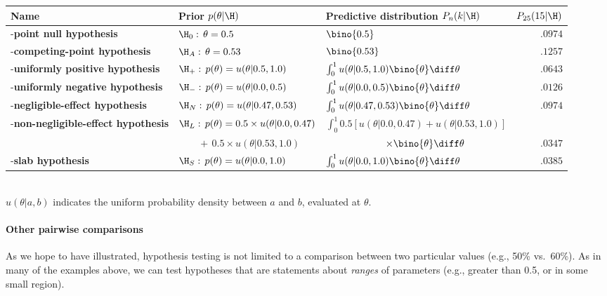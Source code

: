 \begin{tcolorbox}[title=Box~2: Model definitions and equations,code={\singlespacing}]
\tiny\centering\begin{tabular}{lllr}\hline
Name & Prior $p(\theta|\H)$  & Predictive distribution $P_n(k|\H)$&$P_{25}(15|\H)$\\[1ex]\hline
\hyp{\textbf{point null hypothesis}} 
		& $\H_0:\,\theta = 0.5$                        
		& $\bino{0.5}$ 
		& $.0974$
		\\[1ex]
\hyp{\textbf{competing-point hypothesis}}
		& $\H_A:\,\theta = 0.53$
		& $\bino{0.53}$ 
		& $.1257$
		\\[1ex]
\hyp{\textbf{uniformly positive hypothesis}}
		& $\H_+:\,p(\theta) = u(\theta|0.5, 1.0)$            
		& $\int_0^1 u(\theta|0.5, 1.0) \bino{\theta} \diff\theta$ 
		& $.0643$
		\\[1ex]
\hyp{\textbf{uniformly negative hypothesis}}
		& $\H_-:\,p(\theta) = u(\theta|0.0, 0.5)$
		& $\int_0^1 u(\theta|0.0, 0.5) \bino{\theta} \diff\theta$
		& $.0126$
		\\[1ex]
\hyp{\textbf{negligible-effect hypothesis}} 
		& $\H_N:\,p(\theta) = u(\theta|0.47, 0.53)$ 
		& $\int_0^1 u(\theta|0.47, 0.53) \bino{\theta} \diff\theta$
		& $.0974$
		\\[1ex]
\hyp{\textbf{non-negligible-effect hypothesis}}
		& $\H_L:\,p(\theta) = 0.5 \times u(\theta|0.0, 0.47)$ 
		& $\int_0^1 0.5\left[u(\theta|0.0, 0.47) + u(\theta|0.53, 1.0)\right]$\\
		& $\qquad{+}{\,}0.5 \times u(\theta|0.53, 1.0)$
		& $\qquad\qquad\qquad \times \bino{\theta} \diff\theta$ 
		& $.0347$
		\\[1ex]
\hyp{\textbf{slab hypothesis}} 
		& $\H_S:\,p(\theta) = u(\theta|0.0, 1.0)$
		& $\int_0^1 u(\theta|0.0, 1.0) \bino{\theta} \diff\theta$
		& $.0385$
		\\[1ex]\hline
\end{tabular}\\
\indent\flushleft\small $u(\theta|a,b)$ indicates the uniform probability density between $a$ and $b$, evaluated at $\theta$.
\end{tcolorbox}

\paragraph{Other pairwise comparisons} As we hope to have illustrated, hypothesis testing is not limited to a comparison between two particular values (e.g., 50\% vs.\ 60\%).  As in many of the examples above, we can test hypotheses that are statements about \emph{ranges} of parameters (e.g., greater than 0.5, or in some small region).

